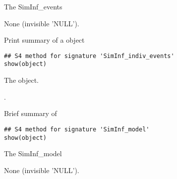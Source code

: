 \documentclass[letterpaper]{book}
\begin{document}
%
\begin{Arguments}
\begin{ldescription}
\item[\code{object}] The SimInf\_events 
\end{ldescription}
\end{Arguments}
%
\begin{Value}
None (invisible 'NULL').
\end{Value}
%
\begin{Description}
Print summary of a  object
\end{Description}
%
\begin{Usage}
\begin{verbatim}
## S4 method for signature 'SimInf_indiv_events'
show(object)
\end{verbatim}
\end{Usage}
%
\begin{Arguments}
\begin{ldescription}
\item[\code{object}] The  object.
\end{ldescription}
\end{Arguments}
%
\begin{Value}
.
\end{Value}
%
\begin{Description}
Brief summary of 
\end{Description}
%
\begin{Usage}
\begin{verbatim}
## S4 method for signature 'SimInf_model'
show(object)
\end{verbatim}
\end{Usage}
%
\begin{Arguments}
\begin{ldescription}
\item[\code{object}] The SimInf\_model 
\end{ldescription}
\end{Arguments}
%
\begin{Value}
None (invisible 'NULL').
\end{Value}
%
\end{document}
